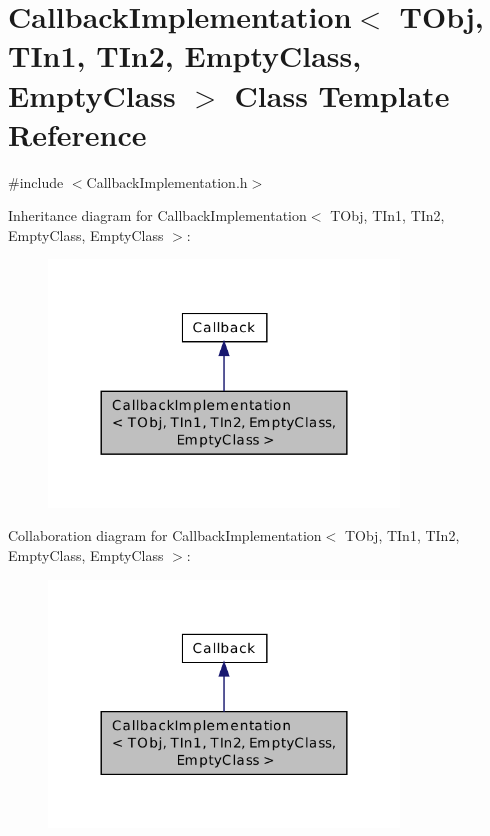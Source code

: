 \hypertarget{class_callback_implementation_3_01_t_obj_00_01_t_in1_00_01_t_in2_00_01_empty_class_00_01_empty_class_01_4}{\section{Callback\-Implementation$<$ T\-Obj, T\-In1, T\-In2, Empty\-Class, Empty\-Class $>$ Class Template Reference}
\label{class_callback_implementation_3_01_t_obj_00_01_t_in1_00_01_t_in2_00_01_empty_class_00_01_empty_class_01_4}
}


{\ttfamily \#include $<$Callback\-Implementation.\-h$>$}



Inheritance diagram for Callback\-Implementation$<$ T\-Obj, T\-In1, T\-In2, Empty\-Class, Empty\-Class $>$\-:\nopagebreak
\begin{figure}[H]
\begin{center}
\leavevmode
\includegraphics[width=264pt]{class_callback_implementation_3_01_t_obj_00_01_t_in1_00_01_t_in2_00_01_empty_class_00_01_empty_class_01_4__inherit__graph}
\end{center}
\end{figure}


Collaboration diagram for Callback\-Implementation$<$ T\-Obj, T\-In1, T\-In2, Empty\-Class, Empty\-Class $>$\-:\nopagebreak
\begin{figure}[H]
\begin{center}
\leavevmode
\includegraphics[width=264pt]{class_callback_implementation_3_01_t_obj_00_01_t_in1_00_01_t_in2_00_01_empty_class_00_01_empty_class_01_4__coll__graph}
\end{center}
\end{figure}
